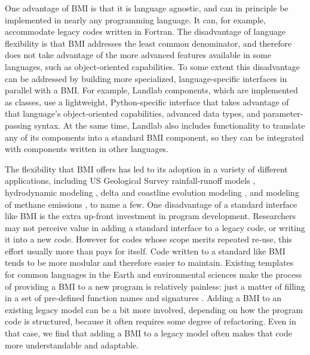 \documentclass{article} %
\begin{document}
One advantage of BMI is that it is language agnostic, and can in principle be implemented in nearly any programming language. It can, for example, accommodate legacy codes written in Fortran. The disadvantage of language flexibility is that BMI addresses the least common denominator, and therefore does not take advantage of the more advanced features available in some languages, such as object-oriented capabilities. To some extent this disadvantage can be addressed by building more specialized, language-specific interfaces in parallel with a BMI. For example, Landlab components, which are implemented as classes, use a lightweight, Python-specific interface that takes advantage of that language's object-oriented capabilities, advanced data types, and parameter-passing syntax. At the same time, Landlab also includes functionality to translate any of its components into a standard BMI component, so they can be integrated with components written in other languages.

The flexibility that BMI offers has led to its adoption in a variety of different applications, including US Geological Survey rainfall-runoff models \citep{markstrom2015prms,regan2018description,regan2019us}, hydrodynamic modeling \citep[including flagship models developed by Deltares and the Netherlands eScience Center,][]{hoch2019advancing,hoch2019evaluating}, delta and coastline evolution modeling \citep{ratliff2018exploring}, and modeling of methane emissions \citep{fox2020agent}, to name a few. One disadvantage of a standard interface like BMI is the extra up-front investment in program development. Researchers may not perceive value in adding a standard interface to a legacy code, or writing it into a new code. However for codes whose scope merits repeated re-use, this effort usually more than pays for itself. Code written to a standard like BMI tends to be more modular and therefore easier to maintain. Existing templates for common languages in the Earth and environmental sciences make the process of providing a BMI to a new program is relatively painless: just a matter of filling in a set of pre-defined function names and signatures \citep{hutton2020basic}. Adding a BMI to an existing legacy model can be a bit more involved, depending on how the program code is structured, because it often requires some degree of refactoring. Even in that case, we find that adding a BMI to a legacy model often makes that code more understandable and adaptable.
\end{document}
